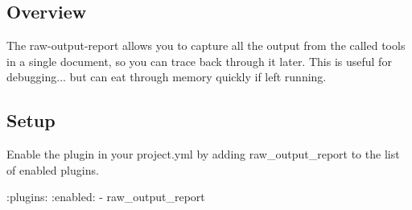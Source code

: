 \subsection*{Overview}

The raw-\/output-\/report allows you to capture all the output from the called tools in a single document, so you can trace back through it later. This is useful for debugging... but can eat through memory quickly if left running.

\subsection*{Setup}

Enable the plugin in your project.\+yml by adding {\ttfamily raw\+\_\+output\+\_\+report} to the list of enabled plugins.


\begin{DoxyCode}
:plugins:
  :enabled:
    - raw\_output\_report
\end{DoxyCode}
 